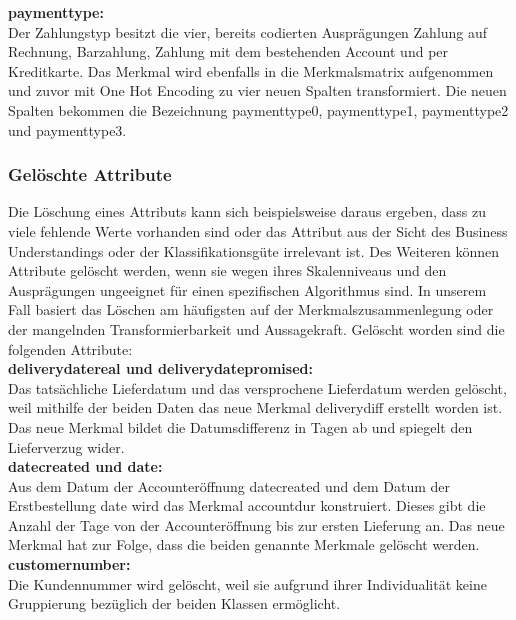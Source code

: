 \textbf{paymenttype:}\\

Der Zahlungstyp besitzt die vier, bereits codierten Ausprägungen Zahlung auf Rechnung, Barzahlung, Zahlung mit dem bestehenden Account und per Kreditkarte. Das Merkmal wird ebenfalls in die Merkmalsmatrix aufgenommen und zuvor mit One Hot Encoding zu vier neuen Spalten transformiert. Die neuen Spalten bekommen die Bezeichnung paymenttype0, paymenttype1, paymenttype2 und paymenttype3.\\


\subsubsection{Gelöschte Attribute}

Die Löschung eines Attributs kann sich beispielsweise daraus ergeben, dass zu viele fehlende Werte vorhanden sind oder das Attribut aus der Sicht des Business Understandings oder der Klassifikationsgüte irrelevant ist. Des Weiteren können Attribute gelöscht werden, wenn sie wegen ihres Skalenniveaus und den Ausprägungen ungeeignet für einen spezifischen Algorithmus sind. In unserem Fall basiert das Löschen am häufigsten auf der Merkmalszusammenlegung oder der mangelnden Transformierbarkeit und Aussagekraft. Gelöscht worden sind die folgenden Attribute:\\

\textbf{deliverydatereal und deliverydatepromised:}\\

Das tatsächliche Lieferdatum und das versprochene Lieferdatum werden gelöscht, weil mithilfe der beiden Daten das neue Merkmal deliverydiff erstellt worden ist. Das neue Merkmal bildet die Datumsdifferenz in Tagen ab und spiegelt den Lieferverzug wider.\\

\textbf{datecreated und date:}\\

Aus dem Datum der Accounteröffnung datecreated und dem Datum der Erstbestellung date wird das Merkmal accountdur konstruiert. Dieses gibt die Anzahl der Tage von der Accounteröffnung bis zur ersten Lieferung an. Das neue Merkmal hat zur Folge, dass die beiden genannte Merkmale gelöscht werden.\\

\textbf{customernumber:}\\

Die Kundennummer wird gelöscht, weil sie aufgrund ihrer Individualität keine Gruppierung bezüglich der beiden Klassen ermöglicht.\\

